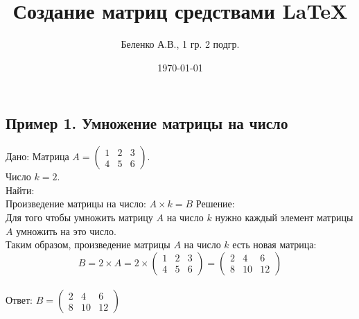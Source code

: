 \documentclass[a4paper,12pt]{article} %
\author{Беленко А.В., 1 гр. 2 подгр.}
\title{Создание матриц средствами \LaTeX}
\date{\today}
\begin{document}

\maketitle
\newpage


\begin{flushleft}

\section*{Пример 1. Умножение матрицы на число}
Дано: Матрица
$ A=\begin{pmatrix}
1 & 2 & 3 \\
4 & 5 & 6
\end{pmatrix} $. \\
Число $k=2$.\\
Найти:\\
Произведение матрицы на число: $A \times k=B$
Решение:\\
Для того чтобы умножить матрицу $A$ на число $k$ нужно каждый элемент матрицы $A$ умножить на это число.\\
Таким образом, произведение матрицы $A$ на число $k$ есть новая матрица: \\
$$ B=2 \times A=2 \times \begin{pmatrix}
1 & 2 & 3 \\
4 & 5 & 6
\end{pmatrix}=\begin{pmatrix}
2 & 4 & 6 \\
8 & 10 & 12
\end{pmatrix}$$ \\
Ответ: $B=\begin{pmatrix}
2 & 4 & 6 \\
8 & 10 & 12
\end{pmatrix}$



\end{flushleft}
\end{document}
